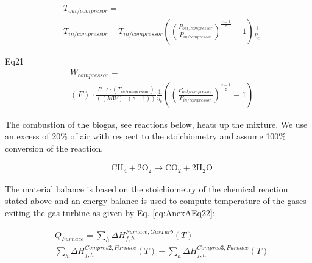 \begin{refsection}[referencesCh2]
\begin{align}
	& {T_{out/compresor}} = \label{eq:AnexAEq20} \\
	& {T_{in/compressor}} + {T_{in/compressor}} \left( {{{\left( {\frac{{{P_{out/compressor}}}}{{{P_{in/compressor}}}}} \right)}^{\frac{{z - 1}}{z}}} - 1} \right)\frac{1}{{{\eta _c}}} \nonumber
\end{align}

Eq21
\begin{align}
	& {W}_{ {compressor}} = \label{eq:AnexAEq21} \\
	& \left( F \right)\cdot\frac{{R\cdot z\cdot\left( {{{{T}}_{in/compressor}}} \right)}}{{\left( {\left( {{{MW}}} \right)\cdot\left( {z - {{1}}} \right)} \right)}}\frac{1}{{{\eta _c}}}\left( {{{\left( {\frac{{{P_{out/compressor}}}}{{{P_{in/compressor}}}}} \right)}^{\frac{{z - 1}}{z}}} - {{1}}} \right)  \nonumber
\end{align}

The combustion of the biogas, see reactions below, heats up the mixture. We use an excess of 20\% of air with respect to the stoichiometry and assume 100\% conversion of the reaction.  

\begin{align}
	& \text{CH}_4 + 2\text{O}_2 \rightarrow \text{CO}_2 + 2\text{H}_2 \text{O} \nonumber
\end{align}

The material balance is based on the stoichiometry of the chemical reaction stated above and an energy balance is used to compute temperature of the gases exiting the gas turbine as given by Eq. \ref{eq:AnexAEq22}:

\begin{align}
	& {Q_{Furnace}} = {\sum\limits_h {{{ {\Delta {H_{f,h}^{{Furnace,GasTurb}}}} (T) }}} } 	- \label{eq:AnexAEq22}\\
	& {\sum\limits_h {{{ {\Delta {H_{f,h}^{{Compres2,Furnace}}} (T)} }}} } -  {\sum\limits_h {{{ {\Delta {H_{f,h}^{{Compres3,Furnace}}}(T)} }}} } 	\nonumber
\end{align}



\end{refsection}
